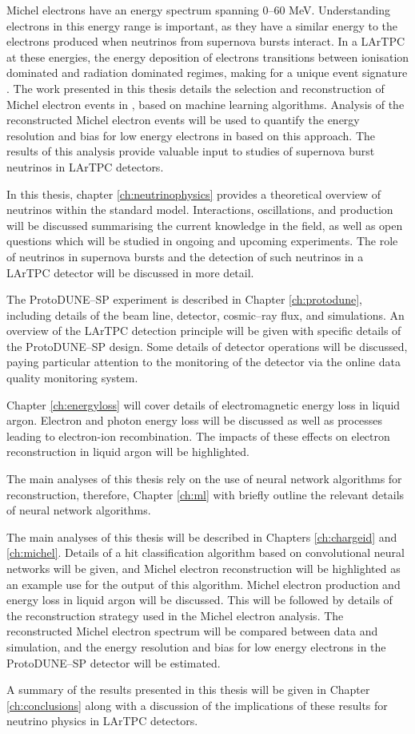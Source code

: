 Michel electrons have an energy spectrum spanning 0--60 MeV. Understanding
electrons in this energy range is important, as they have a similar energy to 
the electrons produced when neutrinos from supernova bursts interact. In a 
LArTPC at these energies, the energy deposition of electrons transitions 
between ionisation dominated and radiation dominated regimes, making for a 
unique event signature \cite{Acciarri:2017sjy}. The work presented in this 
thesis details the selection and reconstruction of Michel electron events in 
\protodune{}, based on machine learning algorithms. Analysis of the 
reconstructed Michel electron events will be used to quantify the energy 
resolution and bias for low energy electrons in \protodune{} based on this 
approach. The results of this analysis provide valuable input to studies of 
supernova burst neutrinos in LArTPC detectors.

In this thesis, chapter \ref{ch:neutrinophysics} provides a theoretical 
overview of neutrinos within the standard model. Interactions, oscillations, 
and production will be discussed summarising the current knowledge in the 
field, as well as open questions which will be studied in ongoing and upcoming 
experiments. The role of neutrinos in supernova bursts and the detection of 
such neutrinos in a LArTPC detector will be discussed in more detail.

The ProtoDUNE--SP experiment is described in Chapter \ref{ch:protodune},
including details of the beam line, detector, cosmic--ray flux, and simulations.
An overview of the LArTPC detection principle will be given with specific
details of the ProtoDUNE--SP design. Some details of detector operations will be
discussed, paying particular attention to the monitoring of the detector via the
online data quality monitoring system.

Chapter \ref{ch:energyloss} will cover details of electromagnetic energy loss
in liquid argon. Electron and photon energy loss will be discussed as well as
processes leading to electron-ion recombination. The impacts of these effects on
electron reconstruction in liquid argon will be highlighted.

The main analyses of this thesis rely on the use of neural network algorithms
for reconstruction, therefore, Chapter \ref{ch:ml} with briefly outline the
relevant details of neural network algorithms.

The main analyses of this thesis will be described in Chapters
\ref{ch:chargeid} and \ref{ch:michel}. Details of a hit classification
algorithm based on convolutional neural networks will be given, and Michel
electron reconstruction will be highlighted as an example use for the output of
this algorithm. Michel electron production and energy loss in liquid argon will
be discussed. This will be followed by details of the reconstruction strategy
used in the Michel electron analysis. The reconstructed Michel electron spectrum
will be compared between data and simulation, and the energy resolution and 
bias for low energy electrons in the ProtoDUNE--SP detector will be estimated. 

A summary of the results presented in this thesis will be given in Chapter
\ref{ch:conclusions} along with a discussion of the implications of these
results for neutrino physics in LArTPC detectors.
